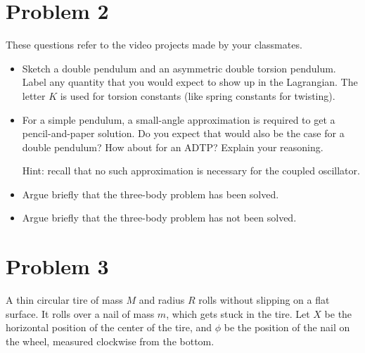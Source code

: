 \documentclass{article}
\begin{document}
\newpage

\section*{Problem 2}

These questions refer to the video projects made by your classmates. 

\begin{itemize}
    \item Sketch a double pendulum and an asymmetric double torsion pendulum. Label any quantity that you would expect to show up in the Lagrangian. The letter $K$ is used for torsion constants (like spring constants for twisting).
    \item For a simple pendulum, a small-angle approximation is required to get a pencil-and-paper solution. Do you expect that would also be the case for a double pendulum? How about for an ADTP? Explain your reasoning.
    
    Hint: recall that no such approximation is necessary for the coupled oscillator.
    \item Argue briefly that the three-body problem has been solved.
    \item Argue briefly that the three-body problem has not been solved. 
    
\end{itemize}

\newpage

\section*{Problem 3}

A thin circular tire of mass $M$ and radius $R$ rolls without slipping on a flat surface. It rolls over a nail of mass $m$, which gets stuck in the tire. Let $X$ be the horizontal position of the center of the tire, and $\phi$ be the position of the nail on the wheel, measured clockwise from the bottom.
\end{document}
